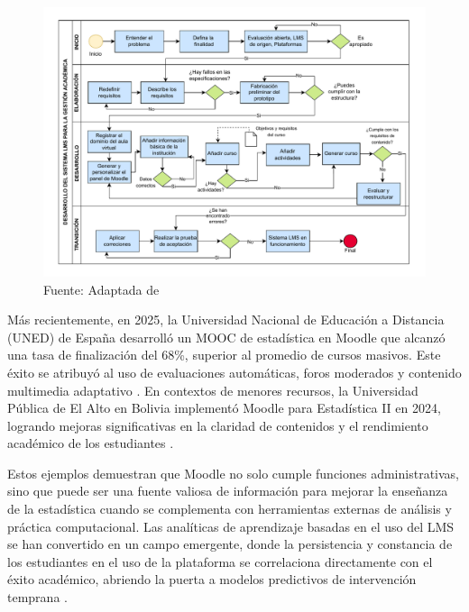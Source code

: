 \documentclass[letter,oneside,12pt,spanish]{report}
\begin{document}
\begin{figure}[ht]
    \centering
    \includegraphics[width=1\textwidth]{Figs/LMS.pdf}
    \label{fig:LMS}
    \\Fuente: Adaptada de \textcite{Pacheco2025}
\end{figure}

Más recientemente, en 2025, la Universidad Nacional de Educación a Distancia (UNED) de España desarrolló un MOOC de estadística en Moodle que alcanzó una tasa de finalización del 68\%, superior al promedio de cursos masivos. Este éxito se atribuyó al uso de evaluaciones automáticas, foros moderados y contenido multimedia adaptativo \parencite{Goh2025}. En contextos de menores recursos, la Universidad Pública de El Alto en Bolivia implementó Moodle para Estadística II en 2024, logrando mejoras significativas en la claridad de contenidos y el rendimiento académico de los estudiantes \parencite{Ndibalema2025}.

Estos ejemplos demuestran que Moodle no solo cumple funciones administrativas, sino que puede ser una fuente valiosa de información para mejorar la enseñanza de la estadística cuando se complementa con herramientas externas de análisis y práctica computacional. Las analíticas de aprendizaje basadas en el uso del LMS se han convertido en un campo emergente, donde la persistencia y constancia de los estudiantes en el uso de la plataforma se correlaciona directamente con el éxito académico, abriendo la puerta a modelos predictivos de intervención temprana \parencite{Goh2025}.
\end{document}
